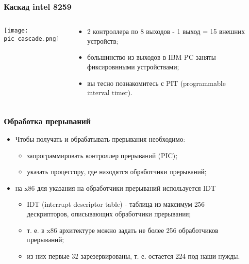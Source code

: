 \begin{frame}
\frametitle{Каскад intel 8259}
\begin{columns}
  \begin{column}{0.5\textwidth}
  \begin{center}
    \texttt{[image: pic\_cascade.png]}
  \end{center}
  \end{column}
  \begin{column}{0.5\textwidth}
  \begin{itemize}
    \item 2 контроллера по 8 выходов - 1 выход = 15 внешних устройств;
    \item большинство из выходов в IBM PC заняты фиксировнными устройствами;
    \item вы тесно познакомитесь с PIT (programmable interval timer).
  \end{itemize}
  \end{column}
\end{columns}
\end{frame}

\begin{frame}
\frametitle{Обработка прерываний}
\begin{itemize}
  \item Чтобы получать и обрабатывать прерывания необходимо:
  \begin{itemize}
    \item запрограммировать контроллер прерываний (PIC);
    \item указать процессору, где находятся обработчики прерываний;
  \end{itemize}
  \item на x86 для указания на обработчики прерываний используется IDT
  \begin{itemize}
    \item IDT (interrupt descriptor table) - таблица из максимум 256
    дескрипторов, описывающих обработчики прерывания;
    \item т. е. в x86 архитектуре можно задать не более 256 обработчиков
    прерываний;
    \item из них первые 32 зарезервированы, т. е. остается 224 под наши нужды.
  \end{itemize}
\end{itemize}
\end{frame}

